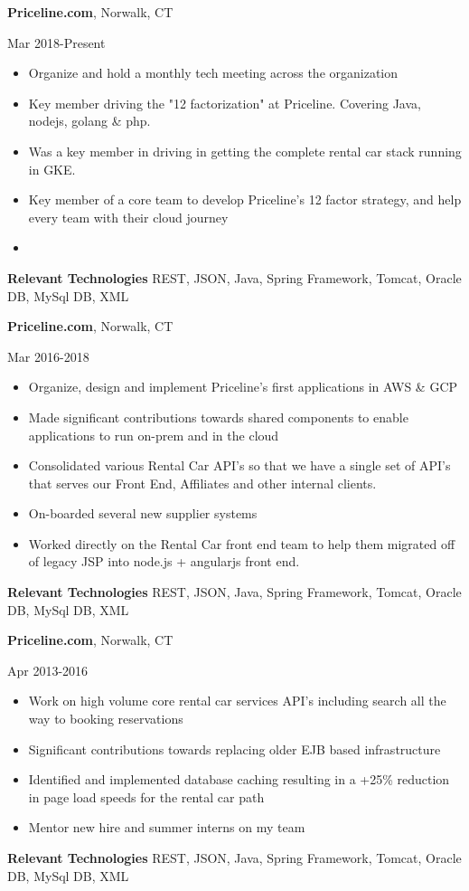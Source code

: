 \documentclass[a4paper,online]{adcv}
\begin{document}
\begin{adcvtabletwo}
  {\textbf{Priceline.com}, Norwalk, CT}
  
   {Mar 2018-Present}
  \begin{itemize}
    \item Organize and hold a monthly tech meeting across the organization
    \item Key member driving the "12 factorization" at Priceline. Covering Java, nodejs, golang \& php.
    \item Was a key member in driving in getting the complete rental car stack running in GKE.
    \item Key member of a core team to develop Priceline's 12 factor strategy, and help every team with their cloud journey
    \item 
  \end{itemize}
  \adcvrowskip
    \adcvrowskip
  \textbf{Relevant Technologies} REST, JSON, Java, Spring Framework, Tomcat, Oracle DB, MySql DB, XML
  
  {\textbf{Priceline.com}, Norwalk, CT}
  
   {Mar 2016-2018}
  \begin{itemize}
    \item Organize, design and implement Priceline's first applications in AWS \& GCP
    \item Made significant contributions towards shared components to enable applications to run on-prem and in the cloud
    \item Consolidated various Rental Car API's so that we have a single set of API's that serves our Front End, Affiliates and other internal clients.
    \item On-boarded several new supplier systems
    \item Worked directly on the Rental Car front end team to help them migrated off of legacy JSP into node.js + angularjs front end.
  \end{itemize}
    \adcvrowskip
  \textbf{Relevant Technologies} REST, JSON, Java, Spring Framework, Tomcat, Oracle DB, MySql DB, XML
  
  \adcvrowskip
  {\textbf{Priceline.com}, Norwalk, CT}
  
   {Apr 2013-2016}
  \begin{itemize}
    \item Work on high volume core rental car services API's including search all the way to booking reservations
    \item Significant contributions towards replacing older EJB based infrastructure
    \item Identified and implemented database caching resulting in a +25\% reduction in page load speeds for the rental car path
    \item Mentor new hire and summer interns on my team
  \end{itemize}
  \adcvrowskip
  \textbf{Relevant Technologies} REST, JSON, Java, Spring Framework, Tomcat, Oracle DB, MySql DB, XML
  

\end{adcvtabletwo}
\end{document}
